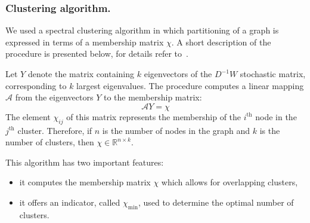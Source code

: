 \subsubsection*{Clustering algorithm.}
We used a spectral clustering algorithm in which partitioning of a graph is expressed in terms of a membership matrix $\chi$.
A short description of the procedure is presented below, for details refer to~\cite{weber2004perron}.

Let $Y$ denote the matrix containing $k$ eigenvectors of the $D^{-1}W$ stochastic matrix, corresponding to $k$ largest eigenvalues.
The procedure computes a linear mapping $\mathcal{A}$ from the eigenvectors $Y$ to the membership matrix:
\begin{displaymath}
\mathcal{A} Y = \chi
\end{displaymath}
The element $\chi_{ij}$ of this matrix represents the membership of the $i^{\textrm{th}}$ node in the $j^{\textrm{th}}$ cluster.
Therefore, if $n$ is the number of nodes in the graph and $k$ is the number of clusters, then $\chi\in\mathbb{R}^{n\times k}$.

This algorithm has two important features:
\begin{itemize}
\item it computes the membership matrix $\chi$ which allows for overlapping clusters,
\item it offers an indicator, called $\chi_{\text{min}}$, used to determine the optimal number of clusters.
\end{itemize}

